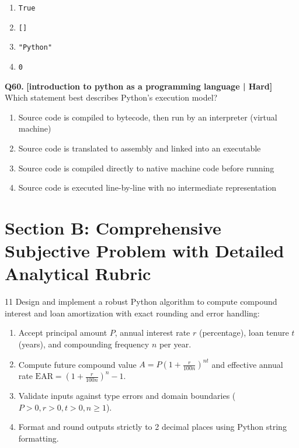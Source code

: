 \begin{enumerate}[label=(\alph*),topsep=2pt,itemsep=1pt,partopsep=0pt,parsep=0pt]
    \item \relax \texttt{True}
    \item \relax \texttt{[]}
    \item \relax \texttt{"Python"}
    \item \relax \texttt{0}
\end{enumerate}
\vspace{2mm}

\noindent\textbf{Q60.} \hfill {\small\color{LPUOrange}\textbf{[introduction to python as a programming language | Hard]}}\\[2pt]
Which statement best describes Python's execution model?

\begin{enumerate}[label=(\alph*),topsep=2pt,itemsep=1pt,partopsep=0pt,parsep=0pt]
    \item \relax Source code is compiled to bytecode, then run by an interpreter (virtual machine)
    \item \relax Source code is translated to assembly and linked into an executable
    \item \relax Source code is compiled directly to native machine code before running
    \item \relax Source code is executed line-by-line with no intermediate representation
\end{enumerate}
\vspace{2mm}


\newpage
\section{Section B: Comprehensive Subjective Problem with Detailed Analytical Rubric}

\begin{subjectiveq}{1}{1}
Design and implement a robust Python algorithm to compute compound interest and loan amortization with exact rounding and error handling:
\begin{enumerate}[label=(\alph*)]
    \item Accept principal amount $P$, annual interest rate $r$ (percentage), loan tenure $t$ (years), and compounding frequency $n$ per year.
    \item Compute future compound value $A = P \left(1 + \frac{r}{100n}\right)^{nt}$ and effective annual rate $\text{EAR} = \left(1 + \frac{r}{100n}\right)^n - 1$.
    \item Validate inputs against type errors and domain boundaries ($P > 0, r > 0, t > 0, n \ge 1$).
    \item Format and round outputs strictly to 2 decimal places using Python string formatting.
\end{enumerate}
\end{subjectiveq}

